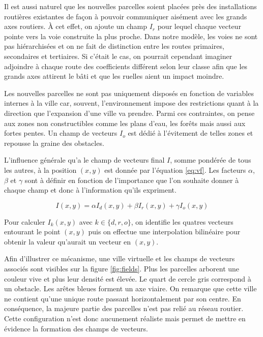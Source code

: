 \documentclass[12pt]{article}
\begin{document}
Il est aussi naturel que les nouvelles parcelles soient placées près
des installations routières existantes de façon à pouvoir communiquer
aisément avec les grands axes routiers. À cet effet, on ajoute un
champ $I_r$ pour lequel chaque vecteur pointe vers la voie construite
la plus proche. Dans notre modèle, les voies ne sont pas hiérarchisées
et on ne fait de distinction entre les routes primaires, secondaires
et tertiaires. Si c'était le cas, on pourrait cependant imaginer
adjoindre à chaque route des coefficients différent selon leur classe
afin que les grands axes attirent le bâti et que les ruelles aient un
impact moindre.

Les nouvelles parcelles ne sont pas uniquement disposés en fonction de
variables internes à la ville car, souvent, l'environnement impose des
restrictions quant à la direction que l'expansion d'une ville va
prendre. Parmi ces contraintes, on pense aux zones non constructibles
comme les plans d'eau, les forêts mais aussi aux fortes pentes. Un
champ de vecteurs $I_o$ est dédié à l'évitement de telles zones et
repousse la graine des obstacles.

L'influence générale qu'a le champ de vecteurs final $I$, somme
pondérée de tous les autres, à la position $(x,y)$ est donnée par
l'équation \ref{eq:vf}. Les facteurs $\alpha$, $\beta$ et $\gamma$
sont à définir en fonction de l'importance que l'on souhaite donner à
chaque champ et donc à l'information qu'ils expriment.

\begin{equation}
  I(x,y) = \alpha I_d(x,y) + \beta I_r(x,y) + \gamma I_o(x,y)
  \label{eq:vf}
\end{equation}

Pour calculer $I_k(x,y)$ avec $k \in \{d,r,o\}$, on identifie les
quatres vecteurs entourant le point $(x,y)$ puis on effectue une
interpolation bilinéaire pour obtenir la valeur qu'aurait un vecteur
en $(x,y)$.

Afin d'illustrer ce mécanisme, une ville virtuelle et les champs de
vecteurs associés sont visibles sur la figure \ref{fig:fields}. Plus
les parcelles arborent une couleur vive et plus leur densité est
élevée. Le quart de cercle gris correspond à un obstacle. Les arêtes
bleues forment un axe viaire. On remarque que cette ville ne contient
qu'une unique route passant horizontalement par son centre. En
conséquence, la majeure partie des parcelles n'est pas relié au réseau
routier. Cette configuration n'est donc aucunement réaliste mais
permet de mettre en évidence la formation des champs de vecteurs.
\end{document}
